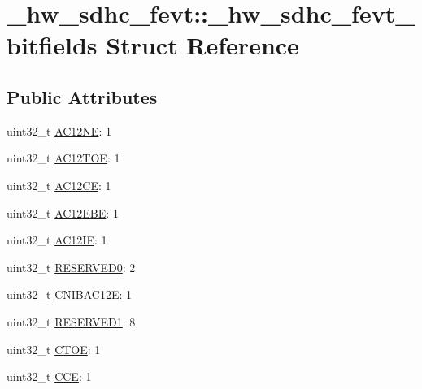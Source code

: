 \hypertarget{struct__hw__sdhc__fevt_1_1__hw__sdhc__fevt__bitfields}{}\section{\+\_\+hw\+\_\+sdhc\+\_\+fevt\+:\+:\+\_\+hw\+\_\+sdhc\+\_\+fevt\+\_\+bitfields Struct Reference}
\label{struct__hw__sdhc__fevt_1_1__hw__sdhc__fevt__bitfields}
\subsection*{Public Attributes}
\begin{DoxyCompactItemize}
\item 
uint32\+\_\+t \hyperlink{struct__hw__sdhc__fevt_1_1__hw__sdhc__fevt__bitfields_adfaa0ebb9c01623f9e560f77d82b699c}{A\+C12\+NE}\+: 1
\item 
uint32\+\_\+t \hyperlink{struct__hw__sdhc__fevt_1_1__hw__sdhc__fevt__bitfields_ab5e6e1a8d06ce0c839a696123fc8ef27}{A\+C12\+T\+OE}\+: 1
\item 
uint32\+\_\+t \hyperlink{struct__hw__sdhc__fevt_1_1__hw__sdhc__fevt__bitfields_a615f9162814cc9de18112dfde0b5b7e1}{A\+C12\+CE}\+: 1
\item 
uint32\+\_\+t \hyperlink{struct__hw__sdhc__fevt_1_1__hw__sdhc__fevt__bitfields_a458c99bf2d83847d04805d067fc5a214}{A\+C12\+E\+BE}\+: 1
\item 
uint32\+\_\+t \hyperlink{struct__hw__sdhc__fevt_1_1__hw__sdhc__fevt__bitfields_a537288daf16d1b14bfa2fbbb3365b216}{A\+C12\+IE}\+: 1
\item 
uint32\+\_\+t \hyperlink{struct__hw__sdhc__fevt_1_1__hw__sdhc__fevt__bitfields_a6cc53d9086f880c92cecd8cbfe797acc}{R\+E\+S\+E\+R\+V\+E\+D0}\+: 2
\item 
uint32\+\_\+t \hyperlink{struct__hw__sdhc__fevt_1_1__hw__sdhc__fevt__bitfields_a1feac6418d36a04dfa04b9ce639e41a5}{C\+N\+I\+B\+A\+C12E}\+: 1
\item 
uint32\+\_\+t \hyperlink{struct__hw__sdhc__fevt_1_1__hw__sdhc__fevt__bitfields_a35e12fa2dfa34bdd132514a292e845ca}{R\+E\+S\+E\+R\+V\+E\+D1}\+: 8
\item 
uint32\+\_\+t \hyperlink{struct__hw__sdhc__fevt_1_1__hw__sdhc__fevt__bitfields_a143ed4ea73991af5bf3d4b2b0d62ad67}{C\+T\+OE}\+: 1
\item 
uint32\+\_\+t \hyperlink{struct__hw__sdhc__fevt_1_1__hw__sdhc__fevt__bitfields_a285d82a37527ff9e6cdedf392829c87a}{C\+CE}\+: 1

\end{DoxyCompactItemize}
